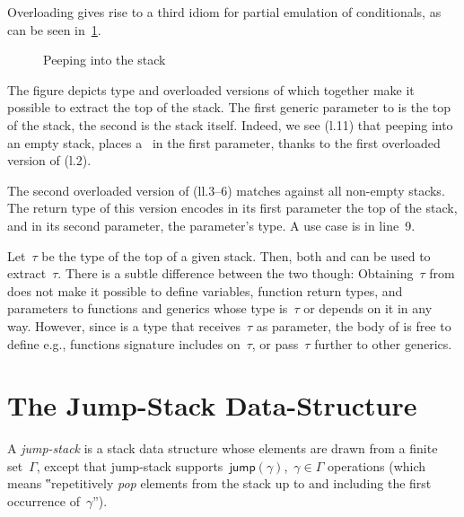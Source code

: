 \documentclass[a4paper,USenglish]{lipics-v2016}
\begin{document}
Overloading gives rise to a third idiom for partial emulation of conditionals, as can be seen
  in~\cref{Figure:peep}.

\begin{figure}[htb]  \caption{Peeping into the stack}  \label{Figure:peep}  \lstset{style=numbered}
\end{figure}

The figure depicts type  and overloaded versions of  which 
  together make it possible to extract the top of the stack.
The first generic parameter to  is the top of the stack, the second is the stack itself.
Indeed, we see (l.11) that peeping into an empty stack, places a~
  in the first parameter, thanks to the first overloaded version of  (l.2).

The second overloaded version of  (ll.3--6) matches
 against all non-empty stacks. 
The return type
 of this version encodes
 in its first parameter
 the top of the stack, and 
  in its second parameter, the parameter's type.
A use case is in line~9.

Let~$τ$ be the type of the top of a given stack.
Then, both  and  can be used to extract~$τ$.
There is a subtle difference between the two though:
Obtaining~$τ$ from  does
  not make it possible to define variables, function return types, and
  parameters to functions and generics whose type is~$τ$ or depends on it in any way.
However, since  is a type that receives~$τ$ as parameter,
  the body of  is free to define e.g., functions signature includes on~$τ$,
  or pass~$τ$ further to other generics.
 
\section{The Jump-Stack Data-Structure}
\label{section:jump}
A \emph{jump-stack} is a stack data structure whose elements are drawn from a finite set~$Γ$,
  except that jump-stack supports~$\textsf{jump}(γ)$,~$γ∈Γ$ operations
  (which means ‟repetitively \emph{pop} elements from the stack up
  to and including the first occurrence of~$γ$”).
\end{document}
